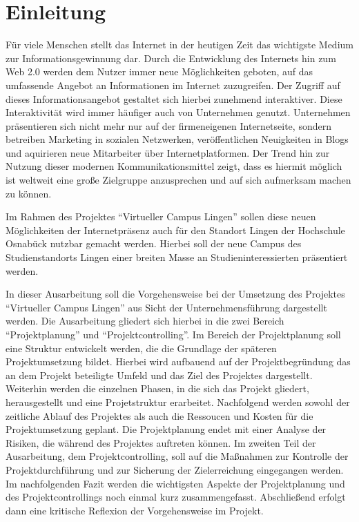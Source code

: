 \section{Einleitung}
\label{sec:Einleitung}

Für viele Menschen stellt das Internet in der heutigen Zeit das wichtigste
Medium zur Informationsgewinnung dar. Durch die Entwicklung des Internets hin
zum Web 2.0 werden dem Nutzer immer neue Möglichkeiten geboten, auf das
umfassende Angebot an Informationen im Internet zuzugreifen. Der Zugriff auf
dieses Informationsangebot gestaltet sich hierbei zunehmend interaktiver.
Diese Interaktivität wird immer häufiger auch von Unternehmen genutzt.
Unternehmen präsentieren sich nicht mehr nur auf der firmeneigenen
Internetseite, sondern betreiben Marketing in sozialen Netzwerken,
veröffentlichen Neuigkeiten in Blogs und aquirieren neue Mitarbeiter über
Internetplatformen. Der Trend hin zur Nutzung dieser modernen
Kommunikationsmittel zeigt, dass es hiermit möglich ist weltweit eine große
Zielgruppe anzusprechen und auf sich aufmerksam machen zu können.

Im Rahmen des Projektes "`Virtueller Campus Lingen"' sollen diese neuen
Möglichkeiten der Internetpräsenz auch für den Standort Lingen der Hochschule
Osnabück nutzbar gemacht werden. Hierbei soll der neue Campus des
Studienstandorts Lingen einer breiten Masse an Studieninteressierten
präsentiert werden.

In dieser Ausarbeitung soll die Vorgehensweise bei der Umsetzung des Projektes
"`Virtueller Campus Lingen"' aus Sicht der Unternehmensführung dargestellt
werden. Die Ausarbeitung gliedert sich hierbei in die zwei Bereich
"`Projektplanung"' und "`Projektcontrolling"'. Im Bereich der Projektplanung
soll eine Struktur entwickelt werden, die die Grundlage der späteren
Projektumsetzung bildet. Hierbei wird aufbauend auf der Projektbegründung das an
dem Projekt beteiligte Umfeld und das Ziel des Projektes dargestellt. Weiterhin
werden die einzelnen Phasen, in die sich das Projekt gliedert, herausgestellt
und eine Projetstruktur erarbeitet. Nachfolgend werden sowohl der zeitliche
Ablauf des Projektes als auch die Ressoucen und Kosten für die Projektumsetzung
geplant. Die Projektplanung endet mit einer Analyse der Risiken, die während des
Projektes auftreten können. Im zweiten Teil der Ausarbeitung, dem
Projektcontrolling, soll auf die Maßnahmen zur Kontrolle der Projektdurchführung
und zur Sicherung der Zielerreichung eingegangen werden. Im nachfolgenden
Fazit werden die wichtigsten Aspekte der Projektplanung und des
Projektcontrollings noch einmal kurz zusammengefasst. Abschließend erfolgt
dann eine kritische Reflexion der Vorgehensweise im Projekt.